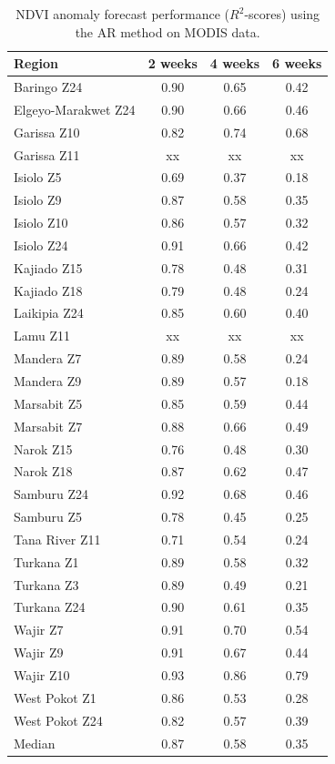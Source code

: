 \documentclass[review]{elsarticle}
\begin{document}
\begin{table}
	\footnotesize
	\caption{NDVI anomaly forecast performance ($R^2$-scores) using the AR method on MODIS data.} \label{tab:NDVI_MODIS}
	\centering
	\begin{tabular}{l|ccc} 
		\toprule
		\textbf{Region}  &  \textbf{2 weeks} &  \textbf{4 weeks}  & \textbf{6 weeks} \\
		\midrule
		Baringo Z24 & 	0.90 	& 	0.65 & 	0.42\\
		Elgeyo-Marakwet Z24 &  	0.90 &  	0.66	& 	0.46 		\\
		Garissa Z10 & 	0.82 & 	0.74 & 	0.68	\\
		Garissa Z11 & xx &  xx &  xx  \\
		Isiolo Z5 & 	0.69& 	0.37 & 	0.18 		 \\
		Isiolo Z9 &  	0.87&	0.58 &	0.35 		\\
		Isiolo Z10 & 	0.86  & 	0.57 & 	0.32 	\\
		Isiolo Z24 & 	0.91& 	0.66& 	0.42	\\
		Kajiado Z15 & 	0.78 & 	0.48 & 	0.31 		\\
		Kajiado Z18& 	0.79 & 	0.48& 	0.24\\
		Laikipia Z24 & 	0.85 	& 	0.60 & 	0.40 		\\
		Lamu Z11 & xx &  xx &  xx \\
		Mandera Z7 & 	0.89 & 	0.58 &	 	0.24 		\\
		Mandera Z9 & 	0.89 & 	0.57 &	 	0.18 		\\
		Marsabit Z5 & 	0.85 & 	0.59 & 	0.44 		\\
		Marsabit Z7 & 	0.88 & 	0.66 & 	0.49 			\\
		Narok Z15 & 	0.76 & 	0.48 & 	0.30 		 \\
		Narok Z18 &	0.87 	& 	0.62 & 	0.47 \\
		Samburu Z24 & 	0.92 	& 	0.68 & 	0.46 		\\
		Samburu Z5 & 	0.78 & 	0.45 &	 	0.25 		\\
		Tana River Z11& 	0.71 & 	0.54 & 	0.24 		\\
		Turkana Z1 &  	0.89 & 	0.58 &	 	0.32 			\\
		Turkana Z3 & 	0.89& 	0.49 & 	0.21 	\\
		Turkana Z24 & 	0.90 & 	0.61 & 	0.35 		 \\
		Wajir Z7 & 	0.91& 	0.70 &	 	0.54 		\\
		Wajir Z9 & 	0.91 & 	0.67 &	 	0.44 			\\
		Wajir Z10& 	0.93 & 	0.86 &  	0.79 		\\
		West Pokot Z1 & 	0.86 & 	0.53 & 	0.28	\\
		West Pokot Z24 & 	0.82 & 	0.57 & 	0.39 		\\
		\bottomrule
		Median & 0.87 &  0.58 &  0.35 \\
		\bottomrule
	\end{tabular}
\end{table}
\end{document}
